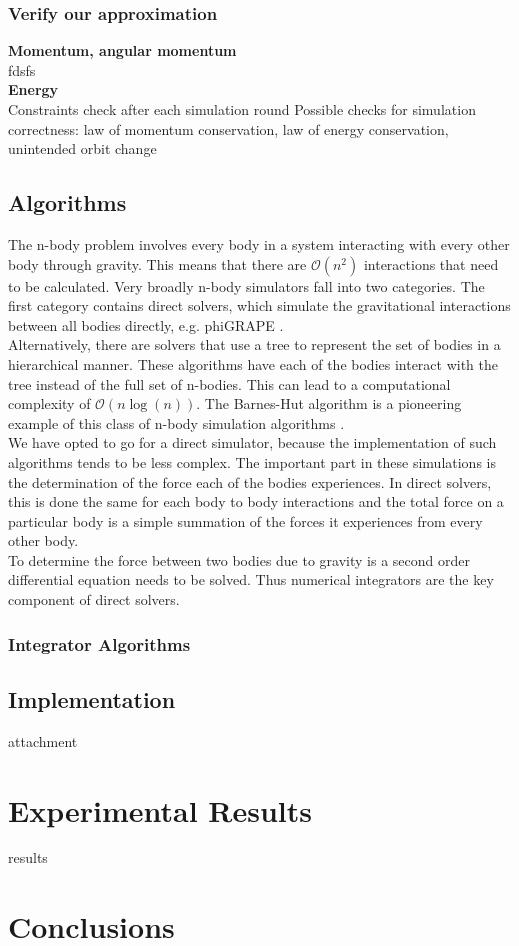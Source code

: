 \documentclass[11pt]{article} %
\begin{document}
\subsubsection{Verify our approximation}
\textbf{Momentum, angular momentum}\\
fdsfs \\
\textbf{Energy}\\
Constraints check after each simulation round
Possible checks for simulation correctness: law of momentum conservation, law of energy conservation, unintended orbit change



\subsection{Algorithms}
The n-body problem involves every body in a system interacting with every other body through gravity. This means that there are $\mathcal{O}(n^2)$ interactions that need to be calculated. Very broadly n-body simulators fall into two categories. The first category contains direct solvers, which simulate the gravitational interactions between all bodies directly, e.g. phiGRAPE \cite{Harfst2007357}. \\
Alternatively, there are solvers that use a tree to represent the set of bodies in a hierarchical manner. These algorithms have each of the bodies interact with the tree instead of the full set of n-bodies. This can lead to a computational complexity of $\mathcal{O}(n \log(n))$. The Barnes-Hut algorithm is a pioneering example of this class of n-body simulation algorithms \cite{barnes1986hierarchical}.\\
We have opted to go for a direct simulator, because the implementation of such algorithms tends to be less complex. The important part in these simulations is the determination of the force each of the bodies experiences. In direct solvers, this is done the same for each body to body interactions and the total force on a particular body is a simple summation of the forces it experiences from every other body. \\
To determine the force between two bodies due to gravity is a second order differential equation needs to be solved. Thus numerical integrators are the key component of direct solvers.
\subsubsection{Integrator Algorithms}


\subsection{Implementation}
attachment
\section{Experimental Results}
\label{sec:results}
results

\section{Conclusions}
\label{sec:conclusion}


\end{document}
